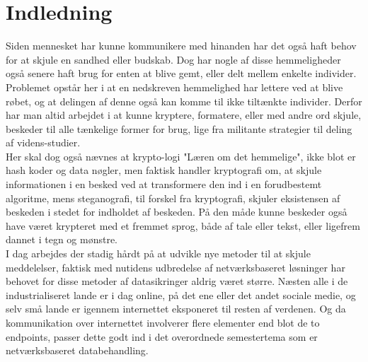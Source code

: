 \section{Indledning}
Siden mennesket har kunne kommunikere med hinanden har det også haft behov for at skjule en sandhed eller budskab. Dog har nogle af disse hemmeligheder også senere haft brug for enten at blive gemt, eller delt mellem enkelte individer. Problemet opstår her i at en nedskreven hemmelighed har lettere ved at blive røbet, og at delingen af denne også kan komme til ikke tiltænkte individer.
Derfor har man altid arbejdet i at kunne kryptere, formatere, eller med andre ord skjule, beskeder til alle tænkelige former for brug, lige fra militante strategier til deling af videns-studier. \\
Her skal dog også nævnes at krypto-logi "Læren om det hemmelige", ikke blot er hash koder og data nøgler, men faktisk handler kryptografi om, at skjule informationen i en besked ved at transformere den ind i en forudbestemt algoritme, mens steganografi, til forskel fra kryptografi, skjuler eksistensen af beskeden i stedet for indholdet af beskeden. På den måde kunne beskeder også have været krypteret med et fremmet sprog, både af tale eller tekst, eller ligefrem dannet i tegn og mønstre.\cite{MeningOfCryptography}\\
I dag arbejdes der stadig hårdt på at udvikle nye metoder til at skjule meddelelser, faktisk med nutidens udbredelse af netværksbaseret løsninger har behovet for disse metoder af datasikringer aldrig været større. Næsten alle i de industrialiseret lande er i dag online, på det ene eller det andet sociale medie, og selv små lande er igennem internettet eksponeret til resten af verdenen. Og da kommunikation over internettet involverer flere elementer end blot de to endpoints, passer dette godt ind i det overordnede semestertema som er netværksbaseret databehandling.